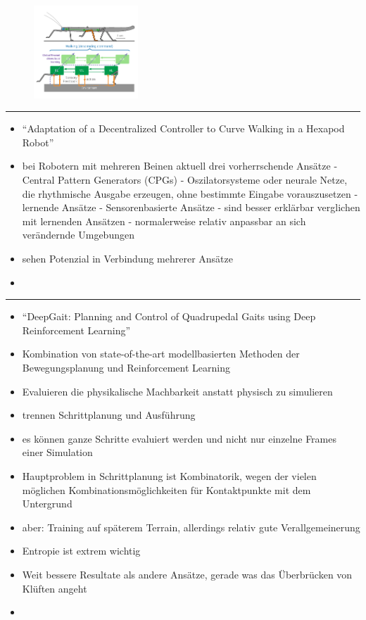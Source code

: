 \begin{figure}
    \centering
    \includegraphics[width = 0.35\textwidth]{Bilder/decentralized-insect.pdf}
    \caption{\cite{schilling2020decentralized}}
\end{figure}


\hrule
\begin{itemize}
    \item \enquote{Adaptation of a Decentralized Controller to Curve Walking in a Hexapod Robot}
    \item bei Robotern mit mehreren Beinen aktuell drei vorherrschende Ansätze
    - Central Pattern Generators (CPGs)
        - Oszilatorsysteme oder neurale Netze, die rhythmische Ausgabe erzeugen, ohne bestimmte Eingabe vorauszusetzen
    - lernende Ansätze
    - Sensorenbasierte Ansätze
        - sind besser erklärbar verglichen mit lernenden Ansätzen
        - normalerweise relativ anpassbar an sich verändernde Umgebungen
    
    \item sehen Potenzial in Verbindung mehrerer Ansätze
    \item \cite{simmering2023walknet}
\end{itemize}


\hrule
\begin{itemize}
    \item \enquote{DeepGait: Planning and Control of Quadrupedal Gaits using Deep Reinforcement Learning}
    \item Kombination von state-of-the-art modellbasierten Methoden der Bewegungsplanung und Reinforcement Learning
    \item Evaluieren die physikalische Machbarkeit anstatt physisch zu simulieren
    \item trennen Schrittplanung und Ausführung
    \item es können ganze Schritte evaluiert werden und nicht nur einzelne Frames einer Simulation
    \item Hauptproblem in Schrittplanung ist Kombinatorik, wegen der vielen möglichen Kombinationsmöglichkeiten für Kontaktpunkte mit dem Untergrund
    \item aber: Training auf späterem Terrain, allerdings relativ gute Verallgemeinerung
    \item Entropie ist extrem wichtig
    \item Weit bessere Resultate als andere Ansätze, gerade was das Überbrücken von Klüften angeht
    \item \cite{tsounis2020deepgait}
\end{itemize}


